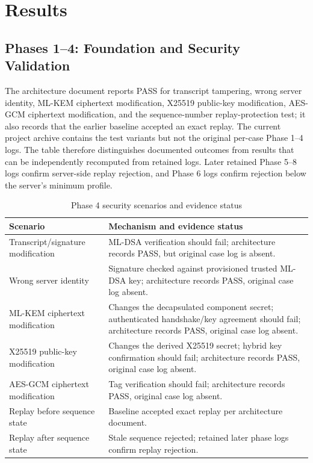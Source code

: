 \documentclass[journal]{IEEEtran}
\begin{document}
\section{Results}
\subsection{Phases 1--4: Foundation and Security Validation}
The architecture document reports PASS for transcript tampering, wrong server identity, ML-KEM ciphertext modification, X25519 public-key modification, AES-GCM ciphertext modification, and the sequence-number replay-protection test; it also records that the earlier baseline accepted an exact replay. The current project archive contains the test variants but not the original per-case Phase 1--4 logs. The table therefore distinguishes documented outcomes from results that can be independently recomputed from retained logs. Later retained Phase 5--8 logs confirm server-side replay rejection, and Phase 6 logs confirm rejection below the server's minimum profile.
\begin{table}[t]
\caption{Phase 4 security scenarios and evidence status}
\label{tab:security}
\centering
\footnotesize
\begin{tabular}{p{}p{}}
\toprule
Scenario & Mechanism and evidence status \\
\midrule
Transcript/signature modification & ML-DSA verification should fail; architecture records PASS, but original case log is absent. \\
Wrong server identity & Signature checked against provisioned trusted ML-DSA key; architecture records PASS, original case log absent. \\
ML-KEM ciphertext modification & Changes the decapsulated component secret; authenticated handshake/key agreement should fail; architecture records PASS, original case log absent. \\
X25519 public-key modification & Changes the derived X25519 secret; hybrid key confirmation should fail; architecture records PASS, original case log absent. \\
AES-GCM ciphertext modification & Tag verification should fail; architecture records PASS, original case log absent. \\
Replay before sequence state & Baseline accepted exact replay per architecture document. \\
Replay after sequence state & Stale sequence rejected; retained later phase logs confirm replay rejection. \\
\bottomrule
\end{tabular}
\end{table}
\end{document}
